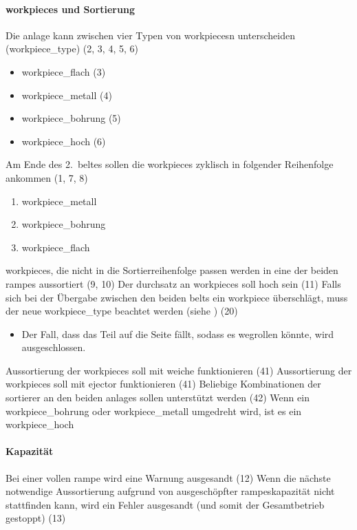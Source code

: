 
\paragraph{\glspl{workpiece} und Sortierung}
\begin{itemize}
     Die \gls{anlage} kann zwischen vier Typen von \glspl{workpiece}n unterscheiden (\gls{workpiece_type}) (2, 3, 4, 5, 6)
    \begin{itemize}
        \item \gls{workpiece_flach} (3)
        \item \gls{workpiece_metall} (4)
        \item \gls{workpiece_bohrung} (5)
        \item \gls{workpiece_hoch} (6)
    \end{itemize}
     Am Ende des 2.\ \gls{belt}es sollen die \glspl{workpiece} zyklisch in folgender Reihenfolge ankommen (1, 7, 8)
    \begin{enumerate}
        \item \gls{workpiece_metall}
        \item \gls{workpiece_bohrung}
        \item \gls{workpiece_flach}
    \end{enumerate}
     \glspl{workpiece}, die nicht in die Sortierreihenfolge passen werden in eine der beiden \glspl{rampe} aussortiert (9, 10)
     Der \gls{durchsatz} an \glspl{workpiece} soll hoch sein (11)
     Falls sich bei der Übergabe zwischen den beiden \glspl{belt} ein \gls{workpiece}
    überschlägt, muss der neue \gls{workpiece_type} beachtet werden (siehe ) (20)
    \begin{itemize}
        \item Der Fall, dass das Teil auf die Seite fällt, sodass es wegrollen könnte, wird ausgeschlossen.
    \end{itemize}
     Aussortierung der \glspl{workpiece} soll mit \gls{weiche} funktionieren (41)
     Aussortierung der \glspl{workpiece} soll mit \gls{ejector} funktionieren (41)
     Beliebige Kombinationen der \gls{sortierer} an den beiden \glspl{anlage} sollen unterstützt werden (42)
     Wenn ein \gls{workpiece_bohrung} oder \gls{workpiece_metall} umgedreht wird, ist es ein \gls{workpiece_hoch}
\end{itemize}

\paragraph{Kapazität}
\begin{itemize}
     Bei einer vollen \gls{rampe} wird eine Warnung ausgesandt (12)
     Wenn die nächste notwendige Aussortierung aufgrund von ausgeschöpfter \glspl{rampe}kapazität
    nicht stattfinden kann, wird ein Fehler ausgesandt (und somit der Gesamtbetrieb gestoppt) (13)
\end{itemize}

